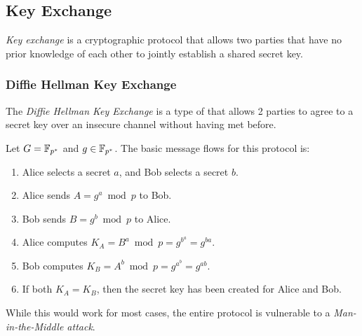 \subsection{Key Exchange}\label{subsec:Key_Exchange}
\begin{definition}\label{def:Key_Exchange}
  \emph{Key exchange} is a cryptographic protocol that allows two parties that have no prior knowledge of each other to jointly establish a shared secret key.
\end{definition}

\subsubsection{Diffie Hellman Key Exchange}\label{subsubsec:Diffie_Hellman_Key_Exchange}
\begin{definition}\label{def:Diffie_Hellman_Key_Exchange}
  The \emph{Diffie Hellman Key Exchange} is a type of  that allows 2 parties to agree to a secret key over an insecure channel without having met before.

  Let $G = \mathbb{F}_{p^{*}}$ and $g \in \mathbb{F}_{p^{*}}$.
  The basic message flows for this protocol is:
  \begin{enumerate}[noitemsep]
  \item Alice selects a secret $a$, and Bob selects a secret $b$.
  \item Alice sends $A = g^{a} \bmod p$ to Bob.
  \item Bob sends $B = g^{b} \bmod p$ to Alice.
  \item Alice computes $K_{A} = B^{a} \bmod p = g^{b^{a}} = g^{ba}$.
  \item Bob computes $K_{B} = A^{b} \bmod p= g^{a^{b}} = g^{ab}$.
  \item If both $K_{A} = K_{B}$, then the secret key has been created for Alice and Bob.
  \end{enumerate}

  \begin{remark}\label{rmk:Flaws_Diffie_Hellman_Key_Exchange}
    While this would work for most cases, the entire  protocol is vulnerable to a \emph{Man-in-the-Middle attack}.
  \end{remark}
\end{definition}

